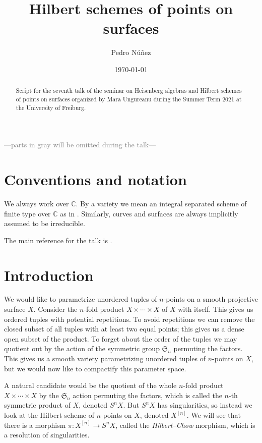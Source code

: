 \documentclass[12pt,a4paper]{amsart}
\title[Hilbert schemes of points on surfaces]{Hilbert schemes of points on surfaces}
\author[Pedro N\'{u}\~{n}ez]{Pedro N\'{u}\~{n}ez}
\date{\today}
\theoremstyle{plain}
\theoremstyle{definition}
\theoremstyle{remark}
\begin{document}
\maketitle

\begin{abstract}
  Script for the seventh talk of the seminar on Heisenberg algebras and Hilbert schemes of points on surfaces organized by Mara Ungureanu during the Summer Term 2021 at the University of Freiburg.
\end{abstract}

\tableofcontents

\begin{center}
  \textcolor{gray}{---parts in gray will be omitted during the talk---}
\end{center}

\setcounter{section}{-1}

\section{Conventions and notation}

We always work over $\mathbb{C}$.
By a variety we mean an integral separated scheme of finite type over $\mathbb{C}$ as in \cite{har77}.
Similarly, curves and surfaces are always implicitly assumed to be irreducible.

The main reference for the talk is \cite[\S 1]{nak99}.

\section{Introduction}

We would like to parametrize unordered tuples of $n$-points on a smooth projective surface $X$.
Consider the $n$-fold product $X \times \cdots \times X$ of $X$ with itself.
This gives us ordered tuples with potential repetitions.
To avoid repetitions we can remove the closed subset of all tuples with at least two equal points; this gives us a dense open subset of the product.
To forget about the order of the tuples we may quotient out by the action of the symmetric group $\mathfrak{S}_{n}$ permuting the factors.
This gives us a smooth variety parametrizing unordered tuples of $n$-points on $X$, but we would now like to compactify this parameter space.

A natural candidate would be the quotient of the whole $n$-fold product $X \times \cdots \times X$ by the $\mathfrak{S}_{n}$ action permuting the factors, which is called the $n$-th symmetric product of $X$, denoted $S^{n}X$.
But $S^{n}X$ has singularities, so instead we look at the Hilbert scheme of $n$-points on $X$, denoted $X^{[n]}$.
We will see that there is a morphism $\pi \colon X^{[n]} \to S^{n}X$, called the \textit{Hilbert--Chow} morphism, which is a resolution of singularities.
\end{document}
